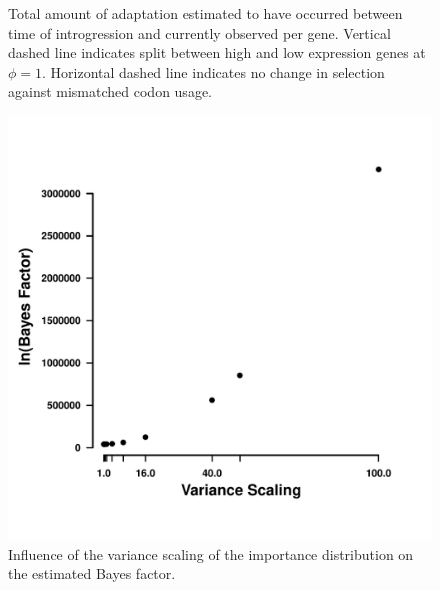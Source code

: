 \documentclass[doublespacing,linenumbers]{bmcart-modified}
\begin{document}
\begin{backmatter}
\begin{figure}
	\caption{Total amount of adaptation estimated to have occurred between time of introgression and currently observed per gene.
	    Vertical dashed line indicates split between high and low expression genes at $\phi = 1$.
	    Horizontal dashed line indicates no change in selection against mismatched codon usage.}
	\label{fig:adapt_tot}
\end{figure}
\null
\vfill
\null
\vfill
\begin{figure}
     \centering
	\includegraphics[width=.5\textwidth]{img/figS9.pdf}%
	\caption{Influence of the variance scaling of the importance distribution on the estimated Bayes factor.}
	\label{fig:bf_scaling}
\end{figure}
\null
\vfill


\end{backmatter}
\end{document}
